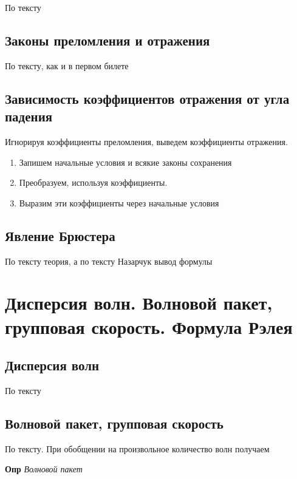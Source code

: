 \documentclass[a4paper, 14pt]{article}
\begin{document}
    По тексту
    
    \subsection{Законы преломления и отражения}
    
    По тексту, как и в первом билете
    
    \subsection{Зависимость коэффициентов отражения от угла падения}
    
    Игнорируя коэффициенты преломления, выведем коэффициенты отражения.
    
    \begin{enumerate}
        \item Запишем начальные условия и всякие законы сохранения
        \item Преобразуем, используя коэффициенты.
        \item Выразим эти коэффициенты через начальные условия
    \end{enumerate}
    
    \subsection{Явление Брюстера}
    
    По тексту теория, а по тексту Назарчук вывод формулы
    
    \section{Дисперсия волн.
    Волновой пакет, групповая скорость.
    Формула Рэлея}
    
    \subsection{Дисперсия волн}
    
    По тексту
    
    \subsection{Волновой пакет, групповая скорость}
    
    По тексту.
    При обобщении на произвольное количество волн получаем
    
    \textbf{Опр} \textit{Волновой пакет}
    
\end{document}
